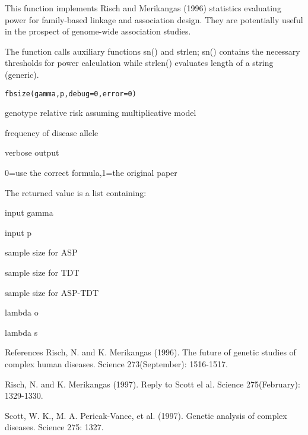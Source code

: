 \documentclass[a4paper]{book}
\begin{document}
\begin{Description}\relax
This function implements Risch and Merikangas (1996) statistics 
evaluating power for family-based linkage and association design.
They are potentially useful in the prospect of genome-wide 
association studies.

The function calls auxiliary functions sn() and strlen; sn() 
contains the necessary thresholds for power calculation while
strlen() evaluates length of a string (generic).\end{Description}
\begin{Usage}
\begin{verbatim}fbsize(gamma,p,debug=0,error=0)\end{verbatim}
\end{Usage}
\begin{Arguments}
\begin{ldescription}
\item[\code{gamma}] genotype relative risk assuming multiplicative model
\item[\code{p}] frequency of disease allele
\item[\code{debug}] verbose output
\item[\code{error}] 0=use the correct formula,1=the original paper
\end{ldescription}
\end{Arguments}
\begin{Value}
The returned value is a list containing:

\begin{ldescription}
\item[\code{gamma}] input gamma
\item[\code{p}] input p
\item[\code{n1}] sample size for ASP
\item[\code{n2}] sample size for TDT
\item[\code{n3}] sample size for ASP-TDT
\item[\code{lambdao}] lambda o
\item[\code{lambdas}] lambda s
\end{ldescription}
\end{Value}
\begin{Section}{References}
Risch, N. and K. Merikangas (1996). The future of genetic studies of
complex human diseases. Science 273(September): 1516-1517.

Risch, N. and K. Merikangas (1997). Reply to Scott el al. Science
275(February): 1329-1330.

Scott, W. K., M. A. Pericak-Vance, et al. (1997). Genetic analysis of 
complex diseases. Science 275: 1327.\end{Section}
\end{document}
